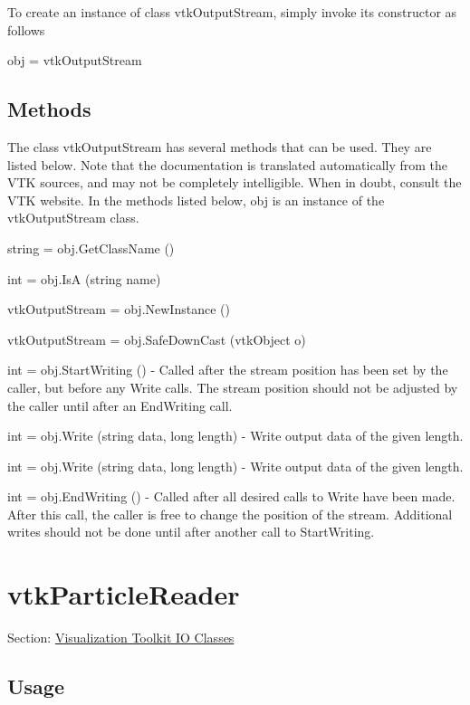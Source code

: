 To create an instance of class vtk\-Output\-Stream, simply invoke its constructor as follows \begin{DoxyVerb}  obj = vtkOutputStream
\end{DoxyVerb}
 \hypertarget{vtkwidgets_vtkxyplotwidget_Methods}{}\subsection{Methods}\label{vtkwidgets_vtkxyplotwidget_Methods}
The class vtk\-Output\-Stream has several methods that can be used. They are listed below. Note that the documentation is translated automatically from the V\-T\-K sources, and may not be completely intelligible. When in doubt, consult the V\-T\-K website. In the methods listed below, {\ttfamily obj} is an instance of the vtk\-Output\-Stream class. 
\begin{DoxyItemize}
\item {\ttfamily string = obj.\-Get\-Class\-Name ()}  
\item {\ttfamily int = obj.\-Is\-A (string name)}  
\item {\ttfamily vtk\-Output\-Stream = obj.\-New\-Instance ()}  
\item {\ttfamily vtk\-Output\-Stream = obj.\-Safe\-Down\-Cast (vtk\-Object o)}  
\item {\ttfamily int = obj.\-Start\-Writing ()} -\/ Called after the stream position has been set by the caller, but before any Write calls. The stream position should not be adjusted by the caller until after an End\-Writing call.  
\item {\ttfamily int = obj.\-Write (string data, long length)} -\/ Write output data of the given length.  
\item {\ttfamily int = obj.\-Write (string data, long length)} -\/ Write output data of the given length.  
\item {\ttfamily int = obj.\-End\-Writing ()} -\/ Called after all desired calls to Write have been made. After this call, the caller is free to change the position of the stream. Additional writes should not be done until after another call to Start\-Writing.  
\end{DoxyItemize}\hypertarget{vtkio_vtkparticlereader}{}\section{vtk\-Particle\-Reader}\label{vtkio_vtkparticlereader}
Section\-: \hyperlink{sec_vtkio}{Visualization Toolkit I\-O Classes} \hypertarget{vtkwidgets_vtkxyplotwidget_Usage}{}\subsection{Usage}\label{vtkwidgets_vtkxyplotwidget_Usage}
